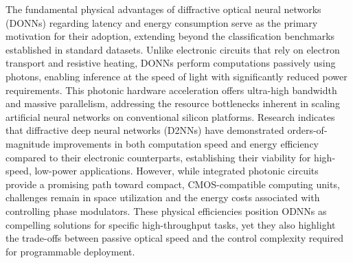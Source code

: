 The fundamental physical advantages of diffractive optical neural networks (DONNs) regarding latency and energy consumption serve as the primary motivation for their adoption, extending beyond the classification benchmarks established in standard datasets. Unlike electronic circuits that rely on electron transport and resistive heating, DONNs perform computations passively using photons, enabling inference at the speed of light with significantly reduced power requirements. This photonic hardware acceleration offers ultra-high bandwidth and massive parallelism, addressing the resource bottlenecks inherent in scaling artificial neural networks on conventional silicon platforms. Research indicates that diffractive deep neural networks (D2NNs) have demonstrated orders-of-magnitude improvements in both computation speed and energy efficiency compared to their electronic counterparts, establishing their viability for high-speed, low-power applications. \citep{doi_10_48550_arxiv_2305_03627_fb0d0b27} \citep{s2_e9e6fc7353675c8e70b11e4ba8a931d959c2e912_909a5a0c} However, while integrated photonic circuits provide a promising path toward compact, CMOS-compatible computing units, challenges remain in space utilization and the energy costs associated with controlling phase modulators. These physical efficiencies position ODNNs as compelling solutions for specific high-throughput tasks, yet they also highlight the trade-offs between passive optical speed and the control complexity required for programmable deployment. \citep{doi_10_1002_lpor_202200348_d54cae18} \citep{doi_10_1109_dac18074_2021_9586204_0c48190f} \citep{doi_10_1038_s41467_022_28702_0_1b79b43c}

